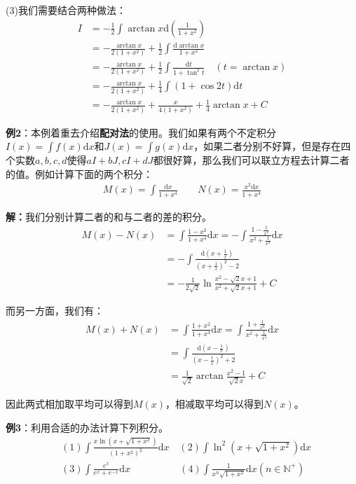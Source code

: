 \documentclass{ctexart}
\let\oldtextbf\textbf %
\renewcommand{\textbf}[1]{\textcolor{btex}{\oldtextbf{#1}}} %
\begin{document}
(3)我们需要结合两种做法：
\begin{align*}
    I&=-\frac{1}{2}\int\arctan x\mathrm{d}(\frac{1}{1+x^2})\\
    &=-\frac{\arctan x}{2(1+x^2)}+\frac{1}{2}\int\frac{\mathrm{d}\arctan x}{1+x^2}\\
    &=-\frac{\arctan x}{2(1+x^2)}+\frac{1}{2}\int\frac{\mathrm{d}t}{1+\tan^2 t}\quad (t=\arctan x)\\
    &=-\frac{\arctan x}{2(1+x^2)}+\frac{1}{4}\int(1+\cos 2t)\mathrm{d}t\\
    &=-\frac{\arctan x}{2(1+x^2)}+\frac{x}{4(1+x^2)}+\frac{1}{4}\arctan x+C
\end{align*}

\textbf{例2}：本例着重去介绍\textbf{配对法}的使用。我们如果有两个不定积分$I(x)=\int f(x)\mathrm{d}x$和$J(x)=\int g(x)\mathrm{d}x$，如果二者分别不好算，但是存在四个实数$a,b,c,d$使得$aI+bJ,cI+dJ$都很好算，那么我们可以联立方程去计算二者的值。例如计算下面的两个积分：
\begin{align*}
    M(x)=\int\frac{\mathrm{d}x}{1+x^4}\qquad N(x)=\frac{x^2\mathrm{d}x}{1+x^4}
\end{align*}

\textbf{解：}我们分别计算二者的和与二者的差的积分。
\begin{align*}
    M(x)-N(x)&=\int\frac{1-x^2}{1+x^4}\mathrm{d}x=-\int\frac{1-\frac{1}{x^2}}{x^2+\frac{1}{x^2}}\mathrm{d}x\\
    &=-\int\frac{\mathrm{d}(x+\frac{1}{x})}{(x+\frac{1}{x})^2-2}\\
    &=-\frac{1}{2\sqrt{2}}\ln\frac{x^2-\sqrt{2}x+1}{x^2+\sqrt{2}x+1}+C
\end{align*}

而另一方面，我们有：
\begin{align*}
    M(x)+N(x)&=\int\frac{1+x^2}{1+x^4}\mathrm{d}x=\int\frac{1+\frac{1}{x^2}}{x^2+\frac{1}{x^2}}\mathrm{d}x\\
    &=\int\frac{\mathrm{d}(x-\frac{1}{x})}{(x-\frac{1}{x})^2+2}\\
    &=\frac{1}{\sqrt{2}}\arctan\frac{x^2-1}{\sqrt{2}x}+C
\end{align*}

因此两式相加取平均可以得到$M(x)$，相减取平均可以得到$N(x)$。

\textbf{例3}：利用合适的办法计算下列积分。
\begin{align*}
    &(1)\int\frac{x\ln(x+\sqrt{1+x^2})}{(1+x^2)^2}\mathrm{d}x\quad 
    (2)\int \ln^2(x+\sqrt{1+x^2})\mathrm{d}x\\
    &(3)\int\frac{e^x}{e^x+e^{-x}}\mathrm{d}x\qquad \qquad\quad
    (4)\int\frac{1}{x^n\sqrt{1+x^2}}\mathrm{d}x (n\in\mathbb{N^+})
\end{align*}
\end{document}
